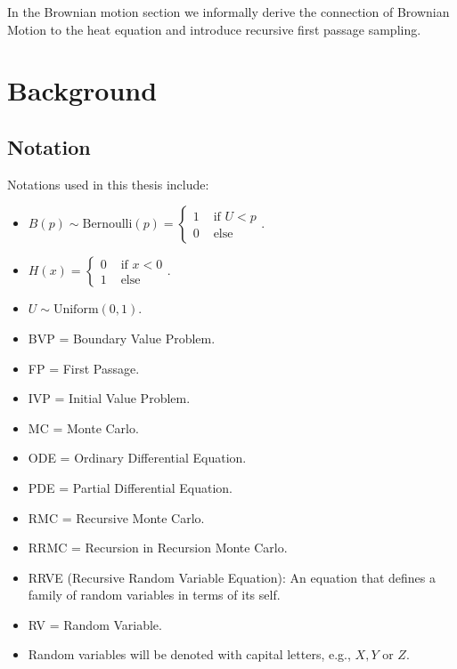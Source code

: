 \documentclass[a4paper,12pt]{article}
\begin{document}
In the Brownian motion section we informally derive the connection of Brownian
Motion to the heat equation and introduce recursive first passage sampling. \\



\section{Background}

\subsection{Notation}
Notations used in this thesis include:

\begin{itemize}
    \item $B(p) \sim \text{Bernoulli}(p) =
              \begin{cases}
                  1 & \text{ if } U<p \\
                  0 & \text{ else }
              \end{cases}. $
    \item $ H(x) =
              \begin{cases}
                  0 & \text{ if } x<0 \\
                  1 & \text{ else }
              \end{cases}.$
    \item $U \sim \text{Uniform}(0,1)$.
    \item BVP = Boundary Value Problem.
    \item FP = First Passage.
    \item IVP = Initial Value Problem.
    \item MC = Monte Carlo.
    \item ODE = Ordinary Differential Equation.
    \item PDE = Partial Differential Equation.
    \item RMC = Recursive Monte Carlo.
    \item RRMC = Recursion in Recursion Monte Carlo.
    \item RRVE (Recursive Random Variable Equation): An equation that defines a
          family of random variables in terms of its self.
    \item RV = Random Variable.
    \item Random variables will be denoted with capital letters, e.g., $X,Y$ or $Z$.
\end{itemize}
\end{document}
